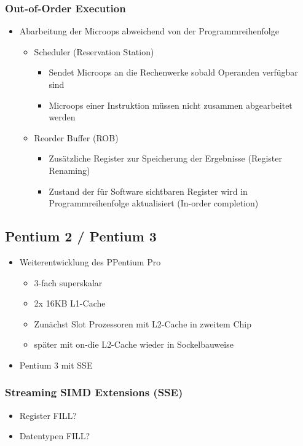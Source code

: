 \subsubsection{Out-of-Order Execution}
\begin{itemize}
	\item Abarbeitung der Microops abweichend von der Programmreihenfolge
	\begin{itemize}
		\item Scheduler (Reservation Station)
		\begin{itemize}
			\item Sendet Microops an die Rechenwerke sobald Operanden verfügbar sind
			\item Microops einer Instruktion müssen nicht zusammen abgearbeitet werden
		\end{itemize}
		\item Reorder Buffer (ROB)
		\begin{itemize}
			\item Zusätzliche Register zur Speicherung der Ergebnisse (Register Renaming)
			\item Zustand der für Software sichtbaren Register wird in Programmreihenfolge aktualisiert (In-order completion)
		\end{itemize}
	\end{itemize}
\end{itemize}
\subsection{Pentium 2 / Pentium 3}
\begin{itemize}
	\item Weiterentwicklung des PPentium Pro
	\begin{itemize}
		\item 3-fach superskalar
		\item 2x 16KB L1-Cache
		\item Zunächst Slot Prozessoren mit L2-Cache in zweitem Chip
		\item später mit on-die L2-Cache wieder in Sockelbauweise
	\end{itemize}
	\item Pentium 3 mit SSE
\end{itemize}
\subsubsection{Streaming SIMD Extensions (SSE)}
\begin{itemize}
	\item Register FILL?
	\item Datentypen FILL?
\end{itemize}

